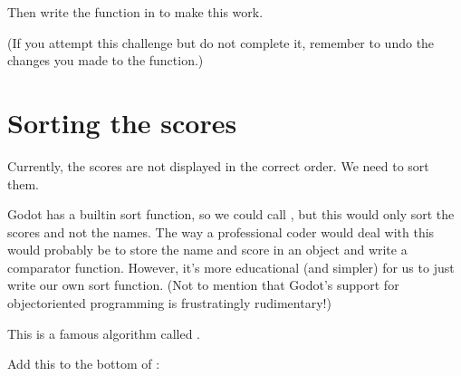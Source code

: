 \documentclass[a4paper,12pt,english]{sphinxmanual}
\begin{document}
\sphinxAtStartPar
Then write the  function in  to make this
work.

\sphinxAtStartPar
(If you attempt this challenge but do not complete it, remember to undo
the changes you made to the  function.)


\section{Sorting the scores}
\label{\detokenize{tutorial:sorting-the-scores}}
\sphinxAtStartPar
Currently, the scores are not displayed in the correct order. We need to
sort them.

\sphinxAtStartPar
Godot has a built\sphinxhyphen{}in sort function, so we could call ,
but this would only sort the scores and not the names. The way a
professional coder would deal with this would probably be to store the
name and score in an object and write a comparator function. However,
it’s more educational (and simpler) for us to just write our own sort
function. (Not to mention that Godot’s support for object\sphinxhyphen{}oriented
programming is frustratingly rudimentary!)

\sphinxAtStartPar
This is a famous algorithm called .

\sphinxAtStartPar
Add this to the bottom of :

\begin{sphinxVerbatim}[commandchars=\\\{\}]
 
       
           
             \PYG{p}{[}\PYG{p}{]}\PYG{p}{[}\PYG{p}{]}
                   \PYG{p}{[}\PYG{p}{]}
                \PYG{p}{[}\PYG{p}{]}  \PYG{p}{[}\PYG{p}{]}
                \PYG{p}{[}\PYG{p}{]}  
                  \PYG{p}{[}\PYG{p}{]}
                \PYG{p}{[}\PYG{p}{]}  \PYG{p}{[}\PYG{p}{]}
                \PYG{p}{[}\PYG{p}{]}  
\end{sphinxVerbatim}
\end{document}
